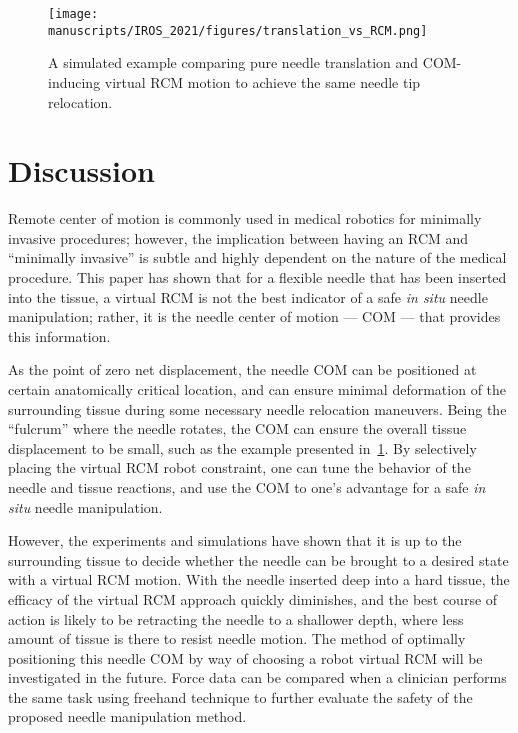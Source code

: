 \begin{figure}[h]
  \centering
  \texttt{[image: manuscripts/IROS\_2021/figures/translation\_vs\_RCM.png]}
  \caption{A simulated example comparing pure needle translation and COM-inducing virtual RCM motion to achieve the same needle tip relocation.}
  \label{fig:trans_vs_com}
\end{figure}

\section{Discussion} 
\label{sec:chap-2-discussion-and-conclusion}
Remote center of motion is commonly used in medical robotics for minimally invasive procedures; however, the implication between having an RCM and ``minimally invasive'' is subtle and highly dependent on the nature of the medical procedure. This paper has shown that for a flexible needle that has been inserted into the tissue, a virtual RCM is not the best indicator of a safe \textit{in situ} needle manipulation; rather, it is the needle center of motion --- COM --- that provides this information. 

As the point of zero net displacement, the needle COM can be positioned at certain anatomically critical location, and can ensure minimal deformation of the surrounding tissue during some necessary needle relocation maneuvers. Being the ``fulcrum'' where the needle rotates, the COM can ensure the overall tissue displacement to be small, such as the example presented in~\cref{fig:trans_vs_com}. By selectively placing the virtual RCM robot constraint, one can tune the behavior of the needle and tissue reactions, and use the COM to one's advantage for a safe \textit{in situ} needle manipulation.

However, the experiments and simulations have shown that it is up to the surrounding tissue to decide whether the needle can be brought to a desired state with a virtual RCM motion. With the needle inserted deep into a hard tissue, the efficacy of the virtual RCM approach quickly diminishes, and the best course of action is likely to be retracting the needle to a shallower depth, where less amount of tissue is there to resist needle motion. The method of optimally positioning this needle COM by way of choosing a robot virtual RCM will be investigated in the future. Force data can be compared when a clinician performs the same task using freehand technique to further evaluate the safety of the proposed needle manipulation method.

